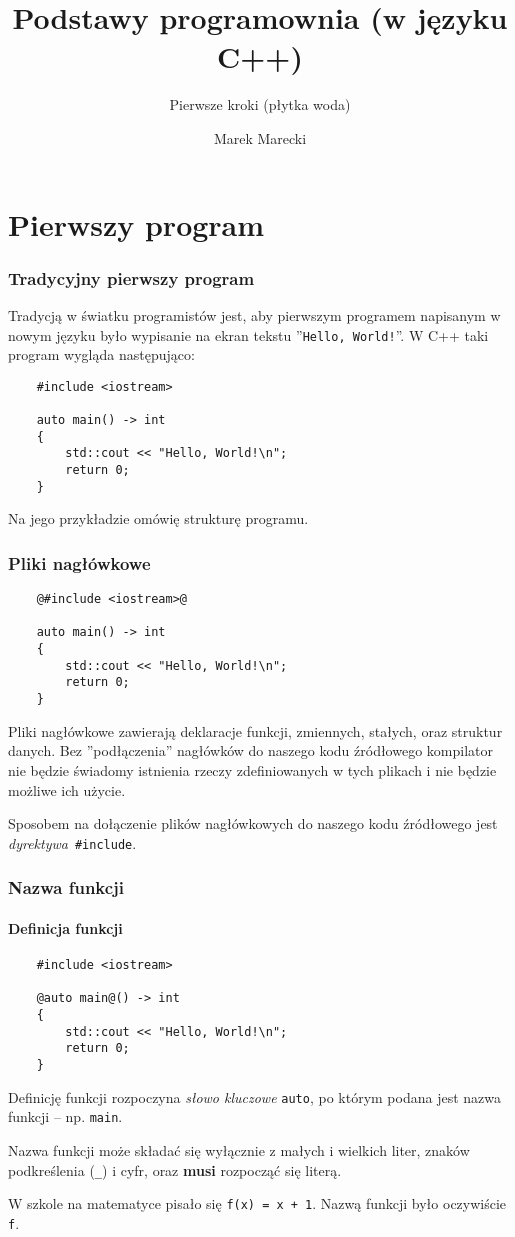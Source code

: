 \documentclass[aspectratio=169]{beamer}
\title{Podstawy programownia (w języku C++)}
\subtitle{Pierwsze kroki (płytka woda)}
\author{Marek Marecki}
\institute{Polsko-Japońska Akademia Technik Komputerowych}
\begin{document}
{%
    \frame{\titlepage}
}

\section{Pierwszy program}

\begin{frame}[fragile]
    \frametitle{Tradycyjny pierwszy program}
    \label{canonical_1st_program_hello_world}

    Tradycją w światku programistów jest, aby pierwszym programem napisanym w
    nowym języku było wypisanie na ekran tekstu ''{\tt Hello, World!}''.
    W C++ taki program wygląda następująco:

    \begin{lstlisting}
    #include <iostream>

    auto main() -> int
    {
        std::cout << "Hello, World!\n";
        return 0;
    }
    \end{lstlisting}

    Na jego przykładzie omówię strukturę programu.
\end{frame}

\begin{frame}[fragile]
    \frametitle{Pliki nagłówkowe}

    {\footnotesize
    \begin{lstlisting}
    @#include <iostream>@

    auto main() -> int
    {
        std::cout << "Hello, World!\n";
        return 0;
    }
    \end{lstlisting}}

    Pliki nagłówkowe zawierają deklaracje funkcji, zmiennych, stałych, oraz
    struktur danych. Bez ''podłączenia'' nagłówków do naszego kodu źródłowego
    kompilator nie będzie świadomy istnienia rzeczy zdefiniowanych w tych
    plikach i nie będzie możliwe ich użycie.

    Sposobem na dołączenie plików nagłówkowych do naszego kodu źródłowego jest
    \emph{dyrektywa}~{\tt \#include}.
\end{frame}

\begin{frame}[fragile]
    \frametitle{Nazwa funkcji}
    \framesubtitle{Definicja funkcji}

    {\footnotesize
    \begin{lstlisting}
    #include <iostream>

    @auto main@() -> int
    {
        std::cout << "Hello, World!\n";
        return 0;
    }
    \end{lstlisting}}

    Definicję funkcji rozpoczyna \emph{słowo kluczowe} {\tt auto}, po którym podana
    jest nazwa funkcji -- np. {\tt main}.

    Nazwa funkcji może składać się wyłącznie z małych i wielkich liter, znaków
    podkreślenia ({\tt \_}) i cyfr, oraz \textbf{musi} rozpocząć się literą.

    {\tiny
    W szkole na matematyce pisało się {\tt f(x) = x + 1}. Nazwą funkcji było
    oczywiście {\tt f}.
    }
\end{frame}
\end{document}
